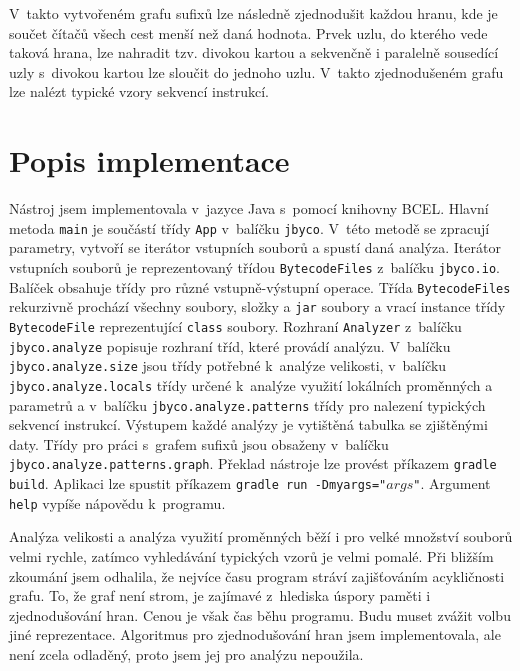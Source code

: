 V~takto vytvořeném grafu sufixů lze následně zjednodušit každou hranu, kde je součet čítačů všech cest menší než daná hodnota. Prvek uzlu, do kterého vede taková hrana, lze nahradit tzv. divokou kartou a sekvenčně i paralelně sousedící uzly s~divokou kartou lze sloučit do jednoho uzlu. V~takto zjednodušeném grafu lze nalézt typické vzory sekvencí instrukcí.

\section{Popis implementace}\label{ToolImplementation}

Nástroj jsem implementovala v~jazyce Java s~pomocí knihovny BCEL. Hlavní metoda \texttt{main} je součástí třídy \texttt{App} v~balíčku \texttt{jbyco}. V~této metodě se zpracují parametry, vytvoří se iterátor vstupních souborů a spustí daná analýza. Iterátor vstupních souborů je reprezentovaný třídou \texttt{BytecodeFiles} z~balíčku \texttt{jbyco.io}. Balíček obsahuje třídy pro různé vstupně-výstupní operace. Třída  \texttt{BytecodeFiles} rekurzivně prochází všechny soubory, složky a \texttt{jar} soubory a vrací instance třídy \texttt{BytecodeFile} reprezentující \texttt{class} soubory. Rozhraní \texttt{Analyzer} z~balíčku \texttt{jbyco.analyze} popisuje rozhraní tříd, které provádí analýzu. V~balíčku \texttt{jbyco.analyze.size} jsou třídy potřebné k~analýze velikosti, v~balíčku \texttt{jbyco.analyze.locals} třídy určené k~analýze využití lokálních proměnných a parametrů a v~balíčku
\texttt{jbyco.analyze.patterns} třídy pro nalezení typických sekvencí instrukcí. Výstupem každé analýzy je vytištěná tabulka se zjištěnými daty. Třídy pro práci s~grafem sufixů jsou obsaženy v~balíčku \texttt{jbyco.analyze.patterns.graph}.
Překlad nástroje lze provést příkazem \texttt{gradle build}. Aplikaci lze spustit příkazem \texttt{gradle run -Dmyargs="$args$"}. Argument \texttt{help} vypíše nápovědu k~programu.

Analýza velikosti a analýza využití proměnných běží i pro velké množství souborů velmi rychle, zatímco vyhledávání typických vzorů je velmi pomalé. Při bližším zkoumání jsem odhalila, že nejvíce času program stráví zajišťováním acykličnosti grafu. To, že graf není strom, je zajímavé z~hlediska úspory paměti i zjednodušování hran. Cenou je však čas běhu programu. Budu muset zvážit volbu jiné reprezentace. Algoritmus pro zjednodušování hran jsem implementovala, ale není zcela odladěný, proto jsem jej pro analýzu nepoužila.


